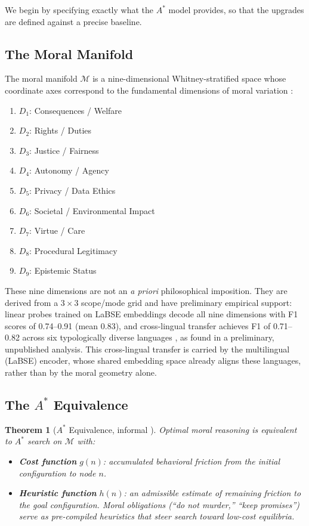 \documentclass[12pt]{article}
\newtheorem{theorem}{Theorem}[section]
\theoremstyle{definition}
\theoremstyle{remark}
\newcommand{\M}{\mathcal{M}}
\begin{document}
We begin by specifying exactly what the $A^*$ model provides, so that the upgrades are defined against a precise baseline.

\subsection{The Moral Manifold}

The moral manifold $\M$ is a nine-dimensional Whitney-stratified space whose coordinate axes correspond to the fundamental dimensions of moral variation \citep{anonymous2026ge}:

\begin{enumerate}
    \item $D_1$: Consequences / Welfare
    \item $D_2$: Rights / Duties
    \item $D_3$: Justice / Fairness
    \item $D_4$: Autonomy / Agency
    \item $D_5$: Privacy / Data Ethics
    \item $D_6$: Societal / Environmental Impact
    \item $D_7$: Virtue / Care
    \item $D_8$: Procedural Legitimacy
    \item $D_9$: Epistemic Status
\end{enumerate}

These nine dimensions are not an \emph{a priori} philosophical imposition. They are derived from a $3 \times 3$ scope/mode grid and have preliminary empirical support: linear probes trained on LaBSE embeddings decode all nine dimensions with F1 scores of 0.74--0.91 (mean 0.83), and cross-lingual transfer achieves F1 of 0.71--0.82 across six typologically diverse languages \citep{thiele2026}, as found in a preliminary, unpublished analysis. This cross-lingual transfer is carried by the multilingual (LaBSE) encoder, whose shared embedding space already aligns these languages, rather than by the moral geometry alone.

\subsection{The $A^*$ Equivalence}

\begin{theorem}[$A^*$ Equivalence, informal {\citep[KA-7]{anonymous2026pe}}]
Optimal moral reasoning is equivalent to $A^*$ search on $\M$ with:
\begin{itemize}
    \item \textbf{Cost function} $g(n)$: accumulated behavioral friction from the initial configuration to node $n$.
    \item \textbf{Heuristic function} $h(n)$: an admissible estimate of remaining friction to the goal configuration. Moral obligations (``do not murder,'' ``keep promises'') serve as pre-compiled heuristics that steer search toward low-cost equilibria.
\end{itemize}
\end{theorem}
\end{document}
